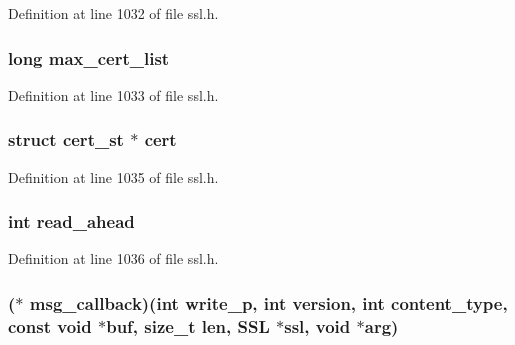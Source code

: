 Definition at line 1032 of file ssl.\+h.

\subsubsection[{\texorpdfstring{max\+\_\+cert\+\_\+list}{max_cert_list}}]{\setlength{\rightskip}{0pt plus 5cm}long max\+\_\+cert\+\_\+list}\hypertarget{structssl__ctx__st_aff3458de3fb94545236802c4042dc051}{}\label{structssl__ctx__st_aff3458de3fb94545236802c4042dc051}


Definition at line 1033 of file ssl.\+h.

\subsubsection[{\texorpdfstring{cert}{cert}}]{\setlength{\rightskip}{0pt plus 5cm}struct {\bf cert\+\_\+st} $\ast$ cert}\hypertarget{structssl__ctx__st_abeb15d9b044d05f1c6506ce64ff9f187}{}\label{structssl__ctx__st_abeb15d9b044d05f1c6506ce64ff9f187}


Definition at line 1035 of file ssl.\+h.

\subsubsection[{\texorpdfstring{read\+\_\+ahead}{read_ahead}}]{\setlength{\rightskip}{0pt plus 5cm}int read\+\_\+ahead}\hypertarget{structssl__ctx__st_abf961fa1992be2cb046dbf46e57a94ff}{}\label{structssl__ctx__st_abf961fa1992be2cb046dbf46e57a94ff}


Definition at line 1036 of file ssl.\+h.

\subsubsection[{\texorpdfstring{msg\+\_\+callback}{msg_callback}}]{($\ast$ msg\+\_\+callback)(int write\+\_\+p, int {\bf version}, int content\+\_\+type, const {\bf void} $\ast$buf, size\+\_\+t {\bf len}, {\bf S\+SL} $\ast$ssl, {\bf void} $\ast$arg)}\hypertarget{structssl__ctx__st_a1c5cabae73050fccbea43d401aa910c0}{}\label{structssl__ctx__st_a1c5cabae73050fccbea43d401aa910c0}


